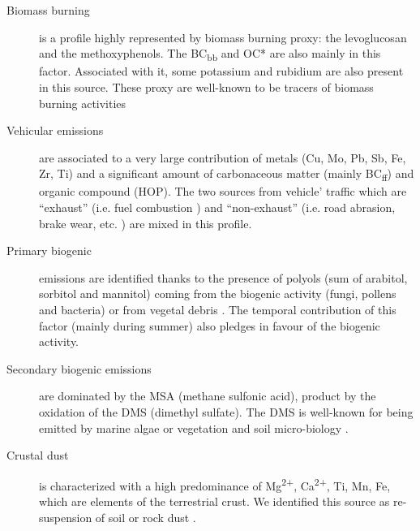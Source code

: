 \begin{description}
    \item[Biomass burning] is a profile highly represented by biomass
        burning proxy: the levoglucosan and the methoxyphenols. The
        BC\textsubscript{bb} and OC* are also mainly in this factor. Associated
        with it, some potassium and rubidium are also present in this source.
        These proxy are well-known to be tracers of biomass burning activities
        \parencite{godoyAerosol2005,jordanLevoglucosan2006,navaBiomass2015,puxbaumLevoglucosan2007}

    \item[Vehicular emissions] are associated to a very large contribution
        of metals (Cu, Mo, Pb, Sb, Fe, Zr, Ti) and a significant amount of
        carbonaceous matter (mainly BC\textsubscript{ff}) and organic compound
        (HOP). The two sources from vehicle' traffic which are ``exhaust'' (i.e.
        fuel combustion \parencite{allenSize2001,huMetals2009,vianaSource2008}) and ``non-exhaust'' (i.e. road abrasion, brake wear, etc.
        \parencite{sandersAirborne2003,sternbeckMetal2002}) are mixed in this
        profile.

    \item[Primary biogenic] emissions are identified thanks to the
        presence of polyols (sum of arabitol, sorbitol and mannitol) coming from the
        biogenic activity (fungi, pollens and bacteria) \parencite{bauerSignificant2008}
        or from vegetal debris \parencite{yttriAmbient2007}. The temporal contribution of
        this factor (mainly during summer) also pledges in favour of the biogenic
        activity.

    \item[Secondary biogenic emissions] are dominated by the MSA (methane
        sulfonic acid), product by the oxidation of the DMS (dimethyl sulfate).
        The DMS is well-known for being emitted by marine algae
        \parencite{saltzmanMethane1983,zhangSurface2014} or vegetation and soil
        micro-biology \parencite{jardineDimethyl2015}.

    \item[Crustal dust] is characterized with a high predominance of
        Mg\textsuperscript{2+}, Ca\textsuperscript{2+}, Ti, Mn, Fe, which are
        elements of the terrestrial crust. We identified this source as
        re-suspension of soil or rock dust
        \parencite{almeidaSource2005,dallostoHourly2013,morenoVariations2011,putaudSizesegregated2004}.


\end{description}
